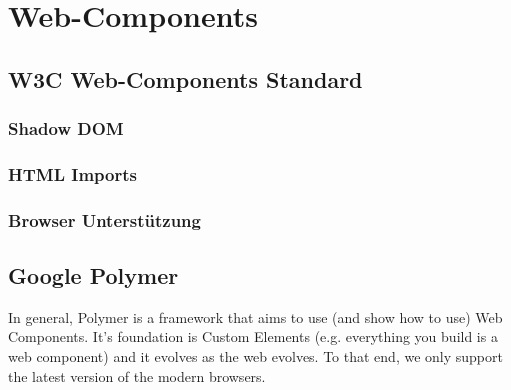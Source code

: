 \section{Web-Components}
\label{sec:3_Web_Components}





\subsection{W3C Web-Components Standard}
\label{sec:3_W3C}








\subsubsection{Shadow DOM}
\label{sec:3_WC_Shadow_DOM}

\subsubsection{HTML Imports}
\label{sec:3_WC_Imports}

\subsubsection{Browser Unterstützung}
\label{sec:3_WC_Support}

\subsection{Google Polymer}
\label{sec:3_Polymer}




\iffalse
In general, Polymer is a framework that aims to use (and show how to use) Web Components. It's foundation is Custom Elements (e.g. everything you build is a web component) and it evolves as the web evolves. To that end, we only support the latest version of the modern browsers.

